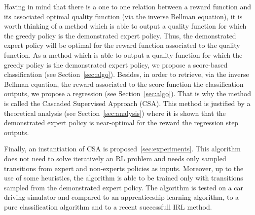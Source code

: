 \documentclass[smallextended]{svjour3}
\begin{document}
Having in mind that there is a one to one relation between a reward function and its associated optimal quality function (via the inverse Bellman equation), it is worth thinking of a method which is able to output a quality function for which the greedy policy is the demonstrated expert policy. Thus, the demonstrated expert policy will be optimal for the reward function associated to the quality function. As a method which is able to output a quality function for which the greedy policy is the demonstrated expert policy, we propose a score-based classification (see Section~\ref{sec:algo}). Besides, in order to retrieve, via the inverse Bellman equation, the reward associated to the score function the classification outputs, we propose a regression (see Section~\ref{sec:algo}). That is why the method is called the Cascaded Supervised Approach (CSA). This method is justified by a theoretical analysis (see Section~\ref{sec:analysis}) where it is shown that the demonstrated expert policy is near-optimal for the reward the regression step outputs.

Finally, an instantiation of CSA is proposed~\ref{sec:experiments}. This algorithm does not need to solve iteratively an RL problem and needs only sampled transitions from expert and non-experts policies as inputs. Moreover, up to the use of some heuristics, the algorithm is able to be trained only with transitions sampled from the demonstrated expert policy. The algorithm is tested on a car driving simulator and compared to an apprenticeship learning algorithm, to a pure classification algorithm and to a recent successfull IRL method.
\end{document}

